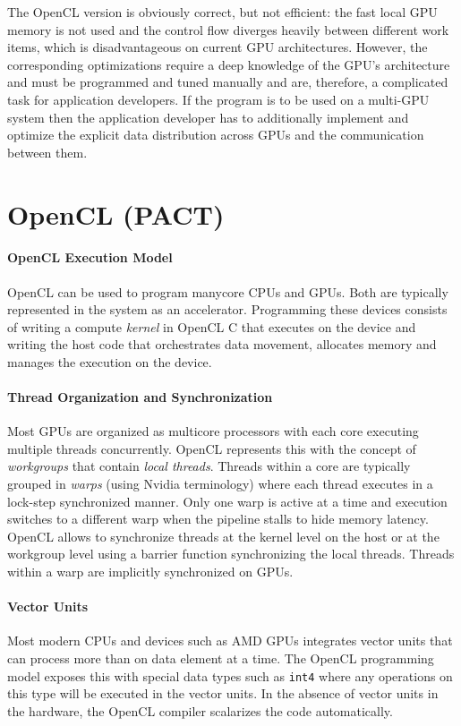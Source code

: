 The OpenCL version is obviously correct, but not efficient:
the fast local GPU memory is not used and the control flow diverges heavily between different work items, which is disadvantageous on current GPU architectures.
However, the corresponding optimizations require a deep knowledge of the GPU's architecture and must be programmed and tuned manually and are, therefore, a complicated task for application developers.
If the program is to be used on a multi-GPU system then the application developer has to additionally implement and optimize the explicit data distribution across GPUs and the communication between them.

\section{OpenCL (PACT)}
\paragraph{OpenCL Execution Model}
OpenCL can be used to program manycore CPUs and GPUs.
Both are typically represented in the system as an accelerator.
Programming these devices consists of writing a compute \emph{kernel} in OpenCL C that executes on the device and writing the host code that orchestrates data movement, allocates memory and manages the execution on the device.

\paragraph{Thread Organization and Synchronization}
Most GPUs are organized as multicore processors with each core executing multiple threads concurrently.
OpenCL represents this with the concept of \emph{workgroups} that contain \emph{local threads}.
Threads within a core are typically grouped in \emph{warps} (using Nvidia terminology) where each thread executes in a lock-step synchronized manner.
Only one warp is active at a time and execution switches to a different warp when the pipeline stalls to hide memory latency.
OpenCL allows to synchronize threads at the kernel level on the host or at the workgroup level using a barrier function synchronizing the local threads.
Threads within a warp are implicitly synchronized on GPUs.


\paragraph{Vector Units}
Most modern CPUs and devices such as AMD GPUs integrates vector units that can process more than on data element at a time.
The OpenCL programming model exposes this with special data types such as \texttt{int4} where any operations on this type will be executed in the vector units.
In the absence of vector units in the hardware, the OpenCL compiler scalarizes the code automatically.

